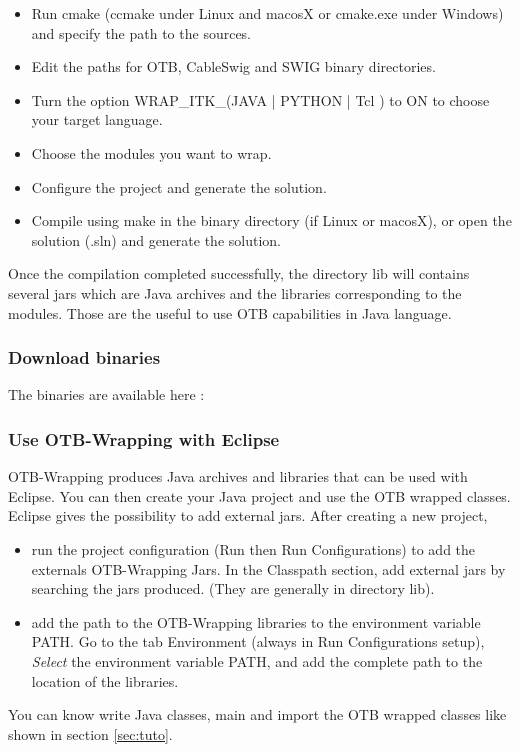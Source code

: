 \begin{itemize}
\item Run cmake (ccmake under Linux and macosX or cmake.exe under Windows) and specify the path to the sources.
\item Edit the paths for OTB, CableSwig and SWIG binary directories.
\item Turn the option WRAP\_ITK\_(JAVA | PYTHON | Tcl  )  to ON to choose your target language.
\item Choose the modules you want to wrap.
\item Configure the project and generate the solution.
\item Compile using make in the binary directory (if Linux or macosX), or open the solution (.sln) and generate the solution.
\end{itemize}

Once the compilation completed successfully, the directory lib will contains several jars which are Java archives 
and the libraries corresponding to the modules. Those are the useful to use OTB capabilities in Java language.

\subsubsection{Download binaries}
The binaries are available here :

\subsubsection{Use OTB-Wrapping with Eclipse}
OTB-Wrapping produces Java archives and libraries that can be used with Eclipse. You can then create your Java project and use the OTB wrapped classes. 
Eclipse gives the possibility to add external jars. 
After creating a new project, 
\begin{itemize}
\item run the project configuration (Run then Run Configurations) to add the externals OTB-Wrapping Jars. In the Classpath section, add external jars 
  by searching the jars produced. (They are generally in directory lib).
\item add the path to the OTB-Wrapping libraries to  the environment variable PATH. Go to the tab Environment (always in Run Configurations setup), 
  \emph{Select} the environment variable PATH, and add the complete path to the location of the libraries.
\end{itemize}

You can know write Java classes, main and import the OTB wrapped classes like shown in section \ref{sec:tuto}.


